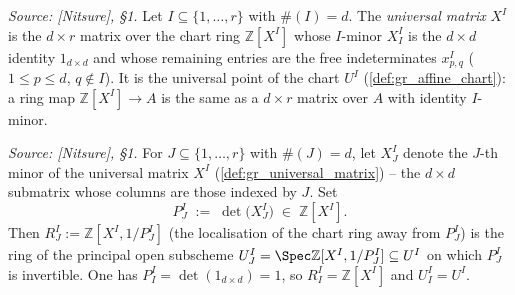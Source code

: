 \begin{definition}

  \label{def:gr_universal_matrix}
  \textit{Source: [Nitsure], \S 1.}
  Let \(I \subseteq \{1,\dots,r\}\) with \(\#(I) = d\). The \emph{universal
  matrix} \(X^I\) is the \(d \times r\) matrix over the chart ring
  \(\mathbb{Z}[X^I]\) whose \(I\)-minor \(X^I_I\) is the \(d \times d\) identity
  \(1_{d\times d}\) and whose remaining entries are the free indeterminates
  \(x^I_{p,q}\) (\(1 \le p \le d\), \(q \notin I\)). It is the universal point of
  the chart \(U^I\) (\cref{def:gr_affine_chart}): a ring map
  \(\mathbb{Z}[X^I] \to A\) is the same as a \(d \times r\) matrix over \(A\)
  with identity \(I\)-minor.
\end{definition}

\begin{definition}

  \label{def:gr_minor_det}
  \textit{Source: [Nitsure], \S 1.}
  For \(J \subseteq \{1,\dots,r\}\) with \(\#(J) = d\), let \(X^I_J\) denote the
  \(J\)-th minor of the universal matrix \(X^I\) (\cref{def:gr_universal_matrix})
  -- the \(d \times d\) submatrix whose columns are those indexed by \(J\). Set
  \[
    P^I_J \;:=\; \det\bigl(X^I_J\bigr) \;\in\; \mathbb{Z}[X^I].
  \]
  Then \(R^I_J := \mathbb{Z}[X^I, 1/P^I_J]\) (the localisation of the chart ring
  away from \(P^I_J\)) is the ring of the principal open subscheme
  \(U^I_J = \Spec \mathbb{Z}[X^I, 1/P^I_J] \subseteq U^I\) on which \(P^I_J\) is
  invertible. One has \(P^I_I = \det(1_{d\times d}) = 1\), so \(R^I_I =
  \mathbb{Z}[X^I]\) and \(U^I_I = U^I\).
\end{definition}

